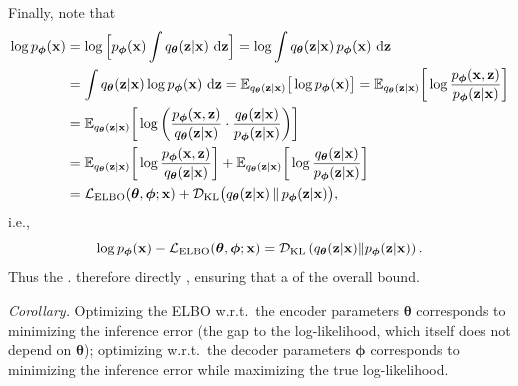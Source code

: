 Finally, note that 
\begingroup\color{notesblue}%
\begin{align*}
\log p_{\bm{\phi}}({\mathbf{x}})
&= \log \Big[ p_{\bm{\phi}}({\mathbf{x}}) \int q_{\bm{\theta}}({\mathbf{z}}|{\mathbf{x}})\,\mathop{}\!\mathrm{d}{\mathbf{z}} \Big]
= \log \int q_{\bm{\theta}}({\mathbf{z}}|{\mathbf{x}})\, p_{\bm{\phi}}({\mathbf{x}})\,\mathop{}\!\mathrm{d}{\mathbf{z}} \\
&= \int q_{\bm{\theta}}({\mathbf{z}}|{\mathbf{x}}) \log p_{\bm{\phi}}({\mathbf{x}})\,\mathop{}\!\mathrm{d}{\mathbf{z}}
= \mathbb{E}_{q_{\bm{\theta}}({\mathbf{z}}|{\mathbf{x}})}\big[\log p_{\bm{\phi}}({\mathbf{x}})\big]
= \mathbb{E}_{q_{\bm{\theta}}({\mathbf{z}}|{\mathbf{x}})}\bigg[\log \frac{p_{\bm{\phi}}({\mathbf{x}},{\mathbf{z}})}{p_{\bm{\phi}}({\mathbf{z}}|{\mathbf{x}})}\bigg] \\
&= \mathbb{E}_{q_{\bm{\theta}}({\mathbf{z}}|{\mathbf{x}})}\bigg[\log \bigg(\frac{p_{\bm{\phi}}({\mathbf{x}},{\mathbf{z}})}{q_{\bm{\theta}}({\mathbf{z}}|{\mathbf{x}})} \cdot \frac{q_{\bm{\theta}}({\mathbf{z}}|{\mathbf{x}})}{p_{\bm{\phi}}({\mathbf{z}}|{\mathbf{x}})}\bigg)\bigg] \\
&= \mathbb{E}_{q_{\bm{\theta}}({\mathbf{z}}|{\mathbf{x}})}\bigg[\log \frac{p_{\bm{\phi}}({\mathbf{x}},{\mathbf{z}})}{q_{\bm{\theta}}({\mathbf{z}}|{\mathbf{x}})}\bigg]
+ \mathbb{E}_{q_{\bm{\theta}}({\mathbf{z}}|{\mathbf{x}})}\bigg[\log \frac{q_{\bm{\theta}}({\mathbf{z}}|{\mathbf{x}})}{p_{\bm{\phi}}({\mathbf{z}}|{\mathbf{x}})}\bigg] \\
&= \mathcal{L}_{\text{ELBO}}(\bm{\theta},\bm{\phi};{\mathbf{x}}) + \mathcal{D}_{\mathrm{KL}}\big(q_{\bm{\theta}}({\mathbf{z}}|{\mathbf{x}})\,\|\,p_{\bm{\phi}}({\mathbf{z}}|{\mathbf{x}})\big),
\end{align*}
\endgroup
i.e.,
\[
\log p_{\bm{\phi}}({\mathbf{x}}) - \mathcal{L}_{\text{ELBO}}(\bm{\theta},\bm{\phi};{\mathbf{x}}) 
= \mathcal{D}_{\mathrm{KL}} \left(q_{\bm{\theta}}({\mathbf{z}}|{\mathbf{x}})\|p_{\bm{\phi}}({\mathbf{z}}|{\mathbf{x}})\right).
\]
Thus the . 
 therefore  directly , ensuring that  a  of the overall bound.
\begin{nknote}
\noindent\textit{Corollary.} Optimizing the ELBO w.r.t.\ the encoder parameters $\bm{\theta}$ corresponds to minimizing the inference error (the gap to the log-likelihood, which itself does not depend on $\bm{\theta}$); optimizing w.r.t.\ the decoder parameters $\bm{\phi}$ corresponds to minimizing the inference error while maximizing the true log-likelihood.
\end{nknote}






